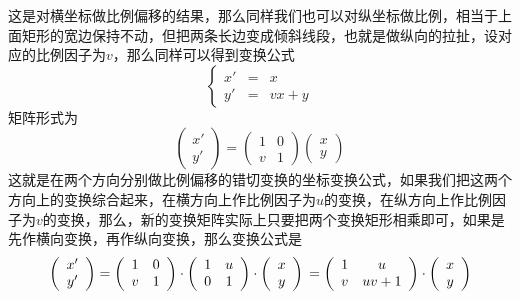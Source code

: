 这是对横坐标做比例偏移的结果，那么同样我们也可以对纵坐标做比例，相当于上面矩形的宽边保持不动，但把两条长边变成倾斜线段，也就是做纵向的拉扯，设对应的比例因子为$v$，那么同样可以得到变换公式
\begin{equation}
  \label{eq:scale-translation-coordinate-formula-3}
  \left\{
    \begin{array}{ccc}
      x' & = &  x \\
      y' & = &  vx+y
    \end{array}
  \right.
\end{equation}
矩阵形式为
\begin{equation*}
  \left(
    \begin{array}{c}
      x' \\
      y'
    \end{array}
  \right)
    =
    \left(
      \begin{array}{cc}
        1 & 0 \\
        v & 1
      \end{array}
    \right)
  \left(
    \begin{array}{c}
      x \\
      y
    \end{array}
  \right)
\end{equation*}
这就是在两个方向分别做比例偏移的错切变换的坐标变换公式，如果我们把这两个方向上的变换综合起来，在横方向上作比例因子为$u$的变换，在纵方向上作比例因子为$v$的变换，那么，新的变换矩阵实际上只要把两个变换矩形相乘即可，如果是先作横向变换，再作纵向变换，那么变换公式是
\begin{equation*}
  \left(
    \begin{array}{c}
      x' \\
      y'
    \end{array}
  \right)
    = 
    \left(
      \begin{array}{cc}
        1 & 0 \\
        v & 1
      \end{array}
    \right)
\cdot
    \left(
      \begin{array}{cc}
        1 & u \\
        0 & 1
      \end{array}
    \right)
 \cdot
  \left(
    \begin{array}{c}
      x \\
      y
    \end{array}
  \right)
  \\
   = 
     \left(
      \begin{array}{cc}
        1 & u \\
        v & uv+1
      \end{array}
    \right)
 \cdot
  \left(
    \begin{array}{c}
      x \\
      y
    \end{array}
  \right)
\end{equation*}
